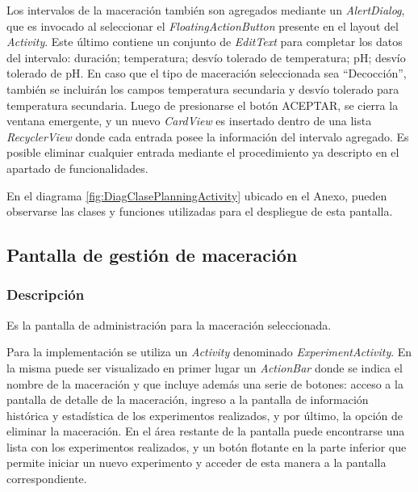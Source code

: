                 \par Los intervalos de la maceración también son agregados mediante un \textit{AlertDialog}, que es invocado al seleccionar el \textit{FloatingActionButton} presente en el layout del \textit{Activity}. Este último contiene un conjunto de \textit{EditText} para completar los datos del intervalo: duración; temperatura; desvío tolerado de temperatura; pH; desvío tolerado de pH. En caso que el tipo de maceración seleccionada sea ``Decocción'', también se incluirán los campos temperatura secundaria y desvío tolerado para temperatura secundaria. Luego de presionarse el botón ACEPTAR, se cierra la ventana emergente, y un nuevo \textit{CardView} es insertado dentro de una lista \textit{RecyclerView} donde cada entrada posee la información del intervalo agregado. Es posible eliminar cualquier entrada mediante el procedimiento ya descripto en el apartado de funcionalidades.
                
                \par En el diagrama \ref{fig:DiagClasePlanningActivity} ubicado en el Anexo, pueden observarse las clases y funciones utilizadas para el despliegue de esta pantalla.
        
        \subsection{Pantalla de gestión de maceración}
        \label{DescripPantallaGestiónMaceración}
            \subsubsection{Descripción}
                \par Es la pantalla de administración para la maceración seleccionada.
                \par Para la implementación se utiliza un \textit{Activity} denominado \textit{ExperimentActivity}. En la misma puede ser visualizado en primer lugar un \textit{ActionBar} donde se indica el nombre de la maceración y que incluye además una serie de botones: acceso a la pantalla de detalle de la maceración, ingreso a la pantalla de información histórica y estadística de los experimentos realizados, y por último, la opción de eliminar la maceración. En el área restante de la pantalla puede encontrarse una lista con los experimentos realizados, y un botón flotante en la parte inferior que permite iniciar un nuevo experimento y acceder de esta manera a la pantalla correspondiente.
                
